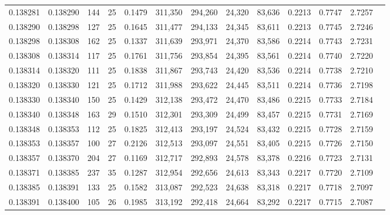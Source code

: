 \begin{tabular}{rrrrrrrrrrrrr}
0.138281 & 0.138290 &   144 &  25 &                                     0.1479 & 311,350 & 294,260 &  24,320 &  83,636 & 0.2213 & 0.7747 & 2.7257 \\
0.138290 & 0.138298 &   127 &  25 &                                     0.1645 & 311,477 & 294,133 &  24,345 &  83,611 & 0.2213 & 0.7745 & 2.7246 \\
0.138298 & 0.138308 &   162 &  25 &                                     0.1337 & 311,639 & 293,971 &  24,370 &  83,586 & 0.2214 & 0.7743 & 2.7231 \\
0.138308 & 0.138314 &   117 &  25 &                                     0.1761 & 311,756 & 293,854 &  24,395 &  83,561 & 0.2214 & 0.7740 & 2.7220 \\
0.138314 & 0.138320 &   111 &  25 &                                     0.1838 & 311,867 & 293,743 &  24,420 &  83,536 & 0.2214 & 0.7738 & 2.7210 \\
0.138320 & 0.138330 &   121 &  25 &                                     0.1712 & 311,988 & 293,622 &  24,445 &  83,511 & 0.2214 & 0.7736 & 2.7198 \\
0.138330 & 0.138340 &   150 &  25 &                                     0.1429 & 312,138 & 293,472 &  24,470 &  83,486 & 0.2215 & 0.7733 & 2.7184 \\
0.138340 & 0.138348 &   163 &  29 &                                     0.1510 & 312,301 & 293,309 &  24,499 &  83,457 & 0.2215 & 0.7731 & 2.7169 \\
0.138348 & 0.138353 &   112 &  25 &                                     0.1825 & 312,413 & 293,197 &  24,524 &  83,432 & 0.2215 & 0.7728 & 2.7159 \\
0.138353 & 0.138357 &   100 &  27 &                                     0.2126 & 312,513 & 293,097 &  24,551 &  83,405 & 0.2215 & 0.7726 & 2.7150 \\
0.138357 & 0.138370 &   204 &  27 &                                     0.1169 & 312,717 & 292,893 &  24,578 &  83,378 & 0.2216 & 0.7723 & 2.7131 \\
0.138371 & 0.138385 &   237 &  35 &                                     0.1287 & 312,954 & 292,656 &  24,613 &  83,343 & 0.2217 & 0.7720 & 2.7109 \\
0.138385 & 0.138391 &   133 &  25 &                                     0.1582 & 313,087 & 292,523 &  24,638 &  83,318 & 0.2217 & 0.7718 & 2.7097 \\
0.138391 & 0.138400 &   105 &  26 &                                     0.1985 & 313,192 & 292,418 &  24,664 &  83,292 & 0.2217 & 0.7715 & 2.7087 \\

\end{tabular}
